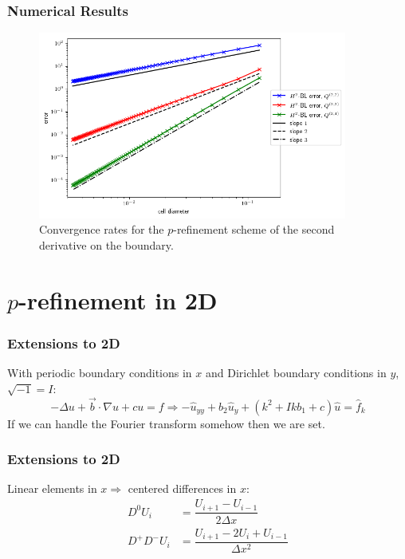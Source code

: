 \documentclass[8pt]{beamer}
\begin{document}
\begin{frame}
    \frametitle{Numerical Results}
    \begin{figure}
        \centering
        \includegraphics[width=4in]{Pictures/oned-cdr-2-h2-errors.png}

        \caption{Convergence rates for the \(p\)-refinement scheme of the second
        derivative on the boundary.}
    \end{figure}
\end{frame}

\section{\(p\)-refinement in 2D}
\begin{frame}
    \frametitle{Extensions to 2D}
    With periodic boundary conditions in \(x\) and Dirichlet boundary conditions
    in \(y\), \(\sqrt{-1} = I\):
    \begin{equation*}
        -\Delta u + \vec{b}\cdot\nabla u + c u = f
        \Rightarrow
        -\hat{u}_{yy} + b_2 \hat{u}_y + (k^2 + I k b_1 + c) \hat{u} = \hat{f}_k
    \end{equation*}
    If we can handle the Fourier transform somehow then we are set.
\end{frame}

\begin{frame}
    \frametitle{Extensions to 2D}
    Linear elements in \(x \Rightarrow\) centered differences in \(x\):
    \begin{align*}
        D^0 U_i &= \dfrac{U_{i + 1} - U_{i - 1}}{2 \Delta x}                  \\
        D^+ D^- U_i &= \dfrac{U_{i + 1} - 2 U_i + U_{i - 1}}{\Delta x^2}
    \end{align*}
\end{frame}
\end{document}
